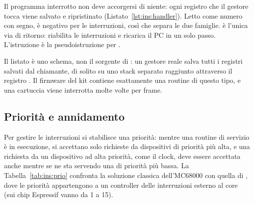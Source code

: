 Il programma interrotto non deve accorgersi di niente: ogni registro che il
gestore tocca viene salvato e ripristinato (Listato~\ref{lst:ins:handler}).
Letto come numero con segno,  è negativo per le interruzioni, così
che  separa le due famiglie.  è l'unica via di ritorno:
riabilita le interruzioni e ricarica il PC in un solo passo. L'istruzione
 è la pseudoistruzione per
.

Il listato è uno schema, non il sorgente di \prg: un gestore reale salva tutti
i registri salvati dal chiamante, di solito su uno stack separato raggiunto
attraverso il registro . Il firmware del kit contiene esattamente
una routine di questo tipo, e una cartuccia viene interrotta molte volte per
frame.

\subsection{Priorità e annidamento}

Per gestire le interruzioni  si stabilisce una priorità: mentre
una routine di servizio è in esecuzione, si accettano solo richieste da
dispositivi di priorità più alta, e una richiesta da un dispositivo ad alta
priorità, come il clock, deve essere accettata anche mentre se ne sta servendo
una di priorità più bassa. La Tabella~\ref{tab:ins:prio} confronta la soluzione
classica dell'MC68000 con quella di \riscv, dove le priorità appartengono a un
controller delle interruzioni esterno al core (sui chip Espressif vanno da 1 a
15).

